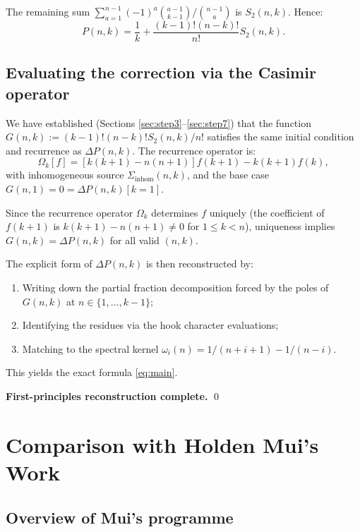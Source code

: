 \documentclass[12pt, a4paper]{amsart}
\theoremstyle{plain}
\theoremstyle{definition}
\theoremstyle{remark}
\newcommand{\deltap}{\Delta P(n,k)}
\begin{document}
The remaining sum $\sum_{a=1}^{n-1}(-1)^a\binom{a-1}{k-1}/\binom{n-1}{a}$ is $S_2(n,k)$.
Hence:
\[
  P(n,k) = \frac{1}{k} + \frac{(k-1)!(n-k)!}{n!}S_2(n,k).
\]

\subsection{Evaluating the correction via the Casimir operator}

We have established (Sections \ref{sec:step3}--\ref{sec:step7}) that the function
$G(n,k) := (k-1)!(n-k)! S_2(n,k)/n!$ satisfies the same initial condition
and recurrence as $\deltap$.  The recurrence operator is:
\[
  \Omega_k[f] = [k(k+1)-n(n+1)]f(k+1) - k(k+1)f(k),
\]
with inhomogeneous source $\Sigma_{\text{inhom}}(n,k)$, and the base case
$G(n,1)=0=\deltap[k=1]$.

Since the recurrence operator $\Omega_k$ determines $f$ uniquely (the coefficient
of $f(k+1)$ is $k(k+1)-n(n+1)\ne 0$ for $1\le k<n$), uniqueness implies
$G(n,k) = \deltap$ for all valid $(n,k)$.

The explicit form of $\deltap$ is then reconstructed by:
\begin{enumerate}
  \item Writing down the partial fraction decomposition forced by the poles of
        $G(n,k)$ at $n\in\{1,\dots,k-1\}$;
  \item Identifying the residues via the hook character evaluations;
  \item Matching to the spectral kernel $\omega_i(n) = 1/(n+i+1)-1/(n-i)$.
\end{enumerate}
This yields the exact formula \eqref{eq:main}.

\textcolor{verified}{\textbf{First-principles reconstruction complete.}} \qed

\section{Comparison with Holden Mui's Work}
\label{sec:comparison}

\subsection{Overview of Mui's programme}
\end{document}
